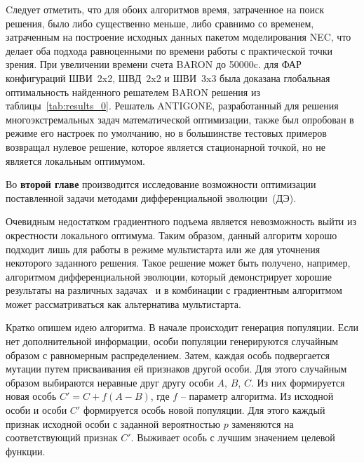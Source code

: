 Cледует отметить, что для обоих алгоритмов время, затраченное на поиск решения, было либо существенно меньше, либо сравнимо со временем, затраченным на построение исходных данных пакетом моделирования NEC, что делает оба подхода равноценными по времени работы с практической точки зрения. При увеличении времени счета BARON до 50000c. для ФАР конфигураций ШВИ~2x2, ШВД~2x2 и ШВИ~3x3 была доказана глобальная оптимальность найденного решателем BARON решения из таблицы~\ref{tab:results_0}.
Решатель ANTIGONE, разработанный для решения многоэкстремальных задач математической оптимизации, также был опробован в режиме его настроек по умолчанию, но в большинстве тестовых примеров возвращал нулевое решение, которое является стационарной точкой, но не является локальным оптимумом.

Во {\textbf{второй главе}} производится исследование возможности оптимизации поставленной задачи методами дифференциальной эволюции~(ДЭ).

Очевидным недостатком градиентного подъема является невозможность выйти из окрестности локального оптимума. Таким образом, данный алгоритм хорошо подходит лишь для работы в режиме мультистарта или же для уточнения некоторого заданного решения. Такое решение может быть получено, например, алгоритмом дифференциальной эволюции, который  демонстрирует хорошие результаты на различных задачах~ и в комбинации с градиентным алгоритмом может рассматриваться как альтернатива мультистарта.

Кратко опишем идею алгоритма. В начале происходит генерация популяции. Если нет дополнительной информации, особи популяции генерируются случайным образом с равномерным распределением. Затем, каждая особь подвергается мутации путем присваивания ей признаков другой особи.
Для этого случайным образом выбираются неравные друг другу особи $A$, $B$, $C$. Из них формируется новая особь $C' = C + f(A - B)$, где $f$ -- параметр алгоритма. Из исходной особи и особи $C'$ формируется особь новой популяции. Для этого каждый признак исходной особи с заданной вероятностью $p$ заменяются на соответствующий признак $C'$. Выживает особь с лучшим значением целевой функции.

